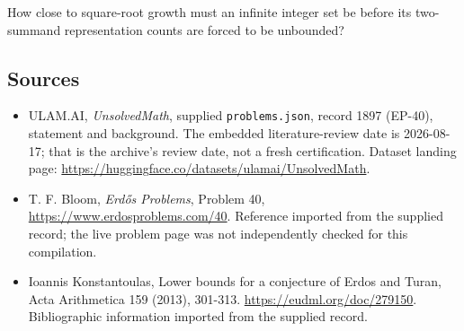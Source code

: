 \documentclass[11pt,a4paper]{article}
\begin{document}
How close to square-root growth must an infinite integer set be before its two-summand representation counts are forced to be unbounded?

\subsection{Sources}

{\small

\begin{itemize}

\item[\hypertarget{source:1897:1}{S1}] ULAM.AI, \emph{UnsolvedMath}, supplied \texttt{problems.json}, record 1897 (EP-40), statement and background. The embedded literature-review date is 2026-08-17; that is the archive’s review date, not a fresh certification. Dataset landing page: \url{https://huggingface.co/datasets/ulamai/UnsolvedMath}.

\item[\hypertarget{source:1897:2}{S2}] T. F. Bloom, \emph{Erdős Problems}, Problem 40, \url{https://www.erdosproblems.com/40}. Reference imported from the supplied record; the live problem page was not independently checked for this compilation.

\item[\hypertarget{source:1897:3}{S3}] Ioannis Konstantoulas, Lower bounds for a conjecture of Erdos and Turan, Acta Arithmetica 159 (2013), 301-313. \url{https://eudml.org/doc/279150}. Bibliographic information imported from the supplied record.

\end{itemize}

}

\label{end:1897}
\end{document}
